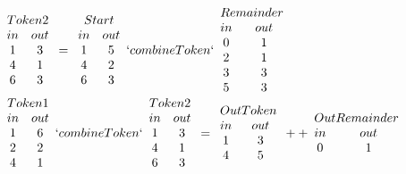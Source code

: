 \begin{example}\label{combSplit}
\mbox{}\\
\begin{center}
$\begin{array}{cc}\multicolumn{2}{c}{Token 2}\\
in & out\\
1 & 3\\
4 & 1\\
6 & 3\\
\end{array}
=
\begin{array}{cc}\multicolumn{2}{c}{Start}\\
in & out\\
1 & 5\\
4 & 2\\
6 & 3\\
\end{array}
`combineToken`
\begin{array}{cc}\multicolumn{2}{c}{Remainder}\\
in & out\\
0 & 1\\
2 & 1\\
3 & 3\\
5 & 3\\
\end{array}
$\\
$\begin{array}{cc}
\multicolumn{2}{c}{Token 1}\\
in & out\\
1 & 6\\
2 & 2\\
4 & 1\\
\end{array}
`combineToken`
\begin{array}{cc}\multicolumn{2}{c}{Token 2}\\
in & out\\
1 & 3\\
4 & 1\\
6 & 3\\
\end{array}
=
\begin{array}{cc}\multicolumn{2}{c}{Out Token}\\
in & out\\
1 & 3\\
4 & 5\\
\end{array} ++ 
\begin{array}{cc}\multicolumn{2}{c}{Out Remainder}\\
in & out\\
0 & 1\\
\end{array}$
\end{center}
\end{example}
